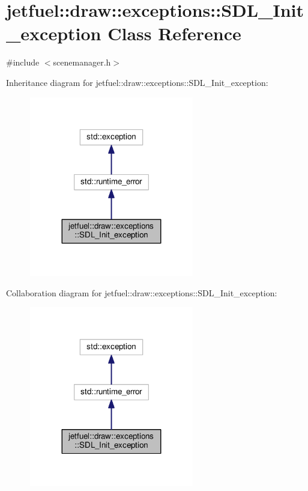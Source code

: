 \hypertarget{classjetfuel_1_1draw_1_1exceptions_1_1SDL__Init__exception}{}\section{jetfuel\+:\+:draw\+:\+:exceptions\+:\+:S\+D\+L\+\_\+\+Init\+\_\+exception Class Reference}
\label{classjetfuel_1_1draw_1_1exceptions_1_1SDL__Init__exception}


{\ttfamily \#include $<$scenemanager.\+h$>$}



Inheritance diagram for jetfuel\+:\+:draw\+:\+:exceptions\+:\+:S\+D\+L\+\_\+\+Init\+\_\+exception\+:\nopagebreak
\begin{figure}[H]
\begin{center}
\leavevmode
\includegraphics[width=203pt]{classjetfuel_1_1draw_1_1exceptions_1_1SDL__Init__exception__inherit__graph}
\end{center}
\end{figure}


Collaboration diagram for jetfuel\+:\+:draw\+:\+:exceptions\+:\+:S\+D\+L\+\_\+\+Init\+\_\+exception\+:\nopagebreak
\begin{figure}[H]
\begin{center}
\leavevmode
\includegraphics[width=203pt]{classjetfuel_1_1draw_1_1exceptions_1_1SDL__Init__exception__coll__graph}
\end{center}
\end{figure}
